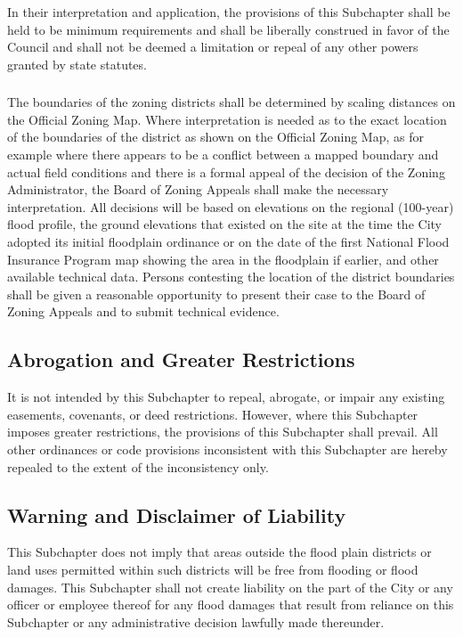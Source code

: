 \subsubsection{}
In their interpretation and application, the provisions of this Subchapter shall be held to be minimum requirements and shall be liberally construed in favor of the Council and shall not be deemed a limitation or repeal of any other powers granted by state statutes.
\subsubsection{}
The boundaries of the zoning districts shall be determined by scaling distances on the Official Zoning Map. Where interpretation is needed as to the exact location of the boundaries of the district as shown on the Official Zoning Map, as for example where there appears to be a conflict between a mapped boundary and actual field conditions and there is a formal appeal of the decision of the Zoning Administrator, the Board of Zoning Appeals shall make the necessary interpretation. All decisions will be based on elevations on the regional (100-year) flood profile, the ground elevations that existed on the site at the time the City adopted its initial floodplain ordinance or on the date of the first National Flood Insurance Program map showing the area in the floodplain if earlier, and other available technical data. Persons contesting the location of the district boundaries shall be given a reasonable opportunity to present their case to the Board of Zoning Appeals and to submit technical evidence.
\subsection{Abrogation and Greater Restrictions}
It is not intended by this Subchapter to repeal, abrogate, or impair any existing easements, covenants, or deed restrictions. However, where this Subchapter imposes greater restrictions, the provisions of this Subchapter shall prevail. All other ordinances or code provisions inconsistent with this Subchapter are hereby repealed to the extent of the inconsistency only.
\subsection{Warning and Disclaimer of Liability}
This Subchapter does not imply that areas outside the flood plain districts or land uses permitted within such districts will be free from flooding or flood damages. This Subchapter shall not create liability on the part of the City or any officer or employee thereof for any flood damages that result from reliance on this Subchapter or any administrative decision lawfully made thereunder.
